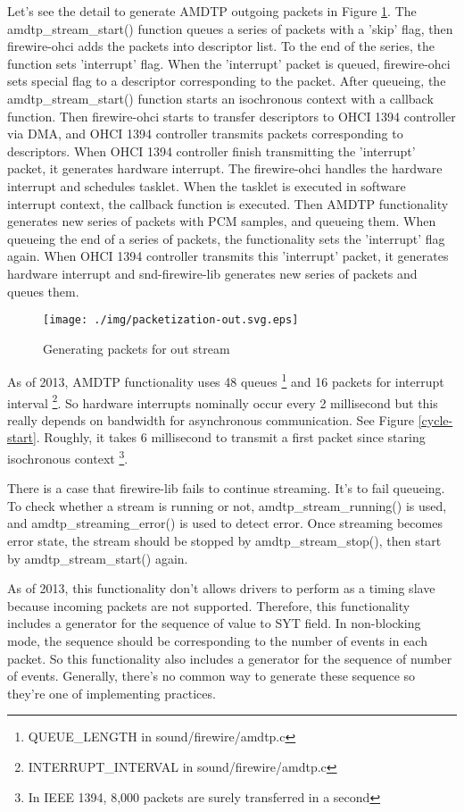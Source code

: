 \documentclass[onecolumn]{article}
\begin{document}
Let's see the detail to generate AMDTP outgoing packets in Figure \ref{fig:packetization-out}. The amdtp\_stream\_start() function queues a series of packets with a 'skip' flag, then firewire-ohci adds the packets into descriptor list. To the end of the series, the function sets 'interrupt' flag. When the 'interrupt' packet is queued, firewire-ohci sets special flag to a descriptor corresponding to the packet. After queueing, the amdtp\_stream\_start() function starts an isochronous context with a callback function. Then firewire-ohci starts to transfer descriptors to OHCI 1394 controller via DMA, and OHCI 1394 controller transmits packets corresponding to descriptors. When OHCI 1394 controller finish transmitting the 'interrupt' packet, it generates hardware interrupt. The firewire-ohci handles the hardware interrupt and schedules tasklet. When the tasklet is executed in software interrupt context, the callback function is executed. Then AMDTP functionality generates new series of packets with PCM samples, and queueing them. When queueing the end of a series of packets, the functionality sets the 'interrupt' flag again. When OHCI 1394 controller transmits this 'interrupt' packet, it generates hardware interrupt and snd-firewire-lib generates new series of packets and queues them.

\begin{figure}[H]
	\centering
	\texttt{[image: ./img/packetization-out.svg.eps]}
	\caption{{Generating packets for out stream}}
	\label{fig:packetization-out}
\end{figure}

As of 2013, AMDTP functionality uses 48 queues \footnote{QUEUE\_LENGTH in sound/firewire/amdtp.c} and 16 packets for interrupt interval \footnote{INTERRUPT\_INTERVAL in sound/firewire/amdtp.c}. So hardware interrupts nominally occur every 2 millisecond but this really depends on bandwidth for asynchronous communication. See Figure \ref{cycle-start}. Roughly, it takes 6 millisecond to transmit a first packet since staring isochronous context \footnote{In IEEE 1394, 8,000 packets are surely transferred in a second}.

There is a case that firewire-lib fails to continue streaming. It's to fail queueing. To check whether a stream is running or not, amdtp\_stream\_running() is used, and amdtp\_streaming\_error() is used to detect error. Once streaming becomes error state, the stream should be stopped by amdtp\_stream\_stop(), then start by amdtp\_stream\_start() again.

As of 2013, this functionality don't allows drivers to perform as a timing slave because incoming packets are not supported. Therefore, this functionality includes a generator for the sequence of value to SYT field. In non-blocking mode, the sequence should be corresponding to the number of events in each packet. So this functionality also includes a generator for the sequence of number of events. Generally, there's no common way to generate these sequence so they're one of implementing practices.
\end{document}
